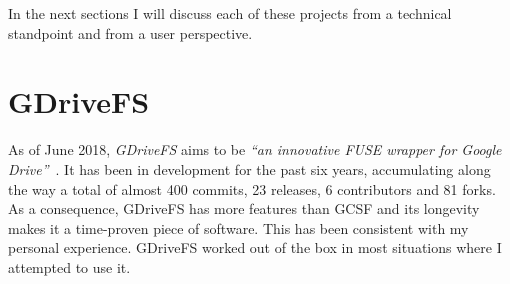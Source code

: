 
\vspace{1em}

In the next sections I will discuss each of these projects from a technical standpoint and from a user perspective.

\section{GDriveFS}

As of June 2018, \emph{GDriveFS} aims to be \emph{``an innovative FUSE wrapper for Google Drive''}~\cite{dsoprea/GDriveFS}. It has been in development for the past six years, accumulating along the way a total of almost 400 commits, 23 releases, 6 contributors and 81 forks. As a consequence, GDriveFS has more features than GCSF and its longevity makes it a time-proven piece of software. This has been consistent with my personal experience. GDriveFS worked out of the box in most situations where I attempted to use it.

